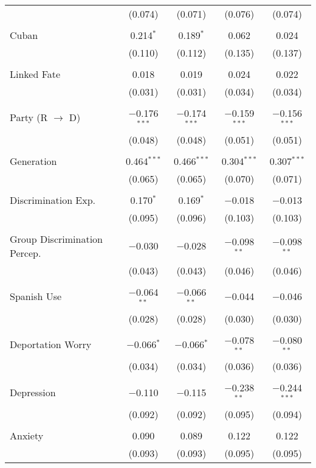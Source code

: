 \begin{table}[!htbp]
\begin{tabular}{@{\extracolsep{5pt}}lcccc}
  & (0.074) & (0.071) & (0.076) & (0.074) \\ 
  & & & & \\ 
 Cuban & 0.214$^{*}$ & 0.189$^{*}$ & 0.062 & 0.024 \\ 
  & (0.110) & (0.112) & (0.135) & (0.137) \\ 
  & & & & \\ 
 Linked Fate & 0.018 & 0.019 & 0.024 & 0.022 \\ 
  & (0.031) & (0.031) & (0.034) & (0.034) \\ 
  & & & & \\ 
 Party (R $\longrightarrow$ D) & $-$0.176$^{***}$ & $-$0.174$^{***}$ & $-$0.159$^{***}$ & $-$0.156$^{***}$ \\ 
  & (0.048) & (0.048) & (0.051) & (0.051) \\ 
  & & & & \\ 
 Generation & 0.464$^{***}$ & 0.466$^{***}$ & 0.304$^{***}$ & 0.307$^{***}$ \\ 
  & (0.065) & (0.065) & (0.070) & (0.071) \\ 
  & & & & \\ 
 Discrimination Exp. & 0.170$^{*}$ & 0.169$^{*}$ & $-$0.018 & $-$0.013 \\ 
  & (0.095) & (0.096) & (0.103) & (0.103) \\ 
  & & & & \\ 
 Group Discrimination Percep. & $-$0.030 & $-$0.028 & $-$0.098$^{**}$ & $-$0.098$^{**}$ \\ 
  & (0.043) & (0.043) & (0.046) & (0.046) \\ 
  & & & & \\ 
 Spanish Use & $-$0.064$^{**}$ & $-$0.066$^{**}$ & $-$0.044 & $-$0.046 \\ 
  & (0.028) & (0.028) & (0.030) & (0.030) \\ 
  & & & & \\ 
 Deportation Worry & $-$0.066$^{*}$ & $-$0.066$^{*}$ & $-$0.078$^{**}$ & $-$0.080$^{**}$ \\ 
  & (0.034) & (0.034) & (0.036) & (0.036) \\ 
  & & & & \\ 
 Depression & $-$0.110 & $-$0.115 & $-$0.238$^{**}$ & $-$0.244$^{***}$ \\ 
  & (0.092) & (0.092) & (0.095) & (0.094) \\ 
  & & & & \\ 
 Anxiety & 0.090 & 0.089 & 0.122 & 0.122 \\ 
  & (0.093) & (0.093) & (0.095) & (0.095) \\ 

\end{tabular}
\end{table}
